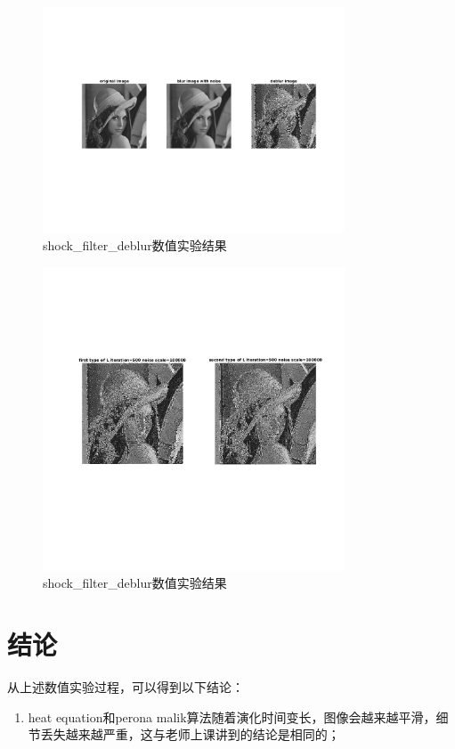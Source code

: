 \documentclass[a4paper, UTF8]{ctexrep}
\begin{document}
				\begin{figure}[htbp!]
					\centering
					\includegraphics[width=0.8\textwidth]{hw2_fig13.png}
					\caption{shock\_filter\_deblur数值实验结果}
					\label{}
				\end{figure}
				\begin{figure}[htbp!]
					\centering
					\includegraphics[width=0.8\textwidth]{hw2_fig14.png}
					\caption{shock\_filter\_deblur数值实验结果}
					\label{}
				\end{figure}
		\section{结论}
			从上述数值实验过程，可以得到以下结论：
			\begin{enumerate}
				\item heat equation和perona malik算法随着演化时间变长，图像会越来越平滑，细节丢失越来越严重，这与老师上课讲到的结论是相同的；
			\end{enumerate}
\end{document}
